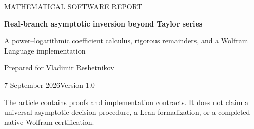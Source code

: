 \documentclass[11pt,a4paper]{article}
\numberwithin{equation}{section}
\theoremstyle{definition}\newtheorem{definition}[theorem]{Definition}
\theoremstyle{remark}\newtheorem{remark}[theorem]{Remark}
\begin{document}
\begin{titlepage}
\vspace*{14mm}
{\large MATHEMATICAL SOFTWARE REPORT\par}
\vspace{10mm}
{\Huge\bfseries Real-branch asymptotic inversion beyond Taylor series\par}
\vspace{8mm}
{\Large A power--logarithmic coefficient calculus, rigorous remainders, and a Wolfram Language implementation\par}
\vspace{13mm}
{\large Prepared for Vladimir Reshetnikov\par}
{\large 7 September 2026\quad\textbullet\quad Version 1.0\par}
\vspace{13mm}
\begin{abstract}
An inverse at a singular endpoint must be selected by a real asymptotic condition, not by the unspecified branch of a symbolic inverse. We construct the branch $g(y)>0$ with $g(y)\sim y$ for the two motivating functions $x+x^2(1+\log x)$ and $x+x^{\sqrt2}$. More generally, we give an explicit differential-operator formula for the inverse of
\[
cx^\alpha\!\left(1+\sum_{j=1}^m x^{\delta_j}P_j(\log x)\right),
\qquad c,\alpha,\delta_j>0.
\]
The formula is valid without analyticity at the endpoint. We prove existence and uniqueness of the selected branch, absolute convergence for sufficiently small positive arguments in this finite-model class, locally finite irrational-power support, and a logarithm-sensitive remainder theorem for arbitrary power cutoffs. A separate finite-smoothness theorem justifies Lagrange derivative blocks for a larger class of real functions. Source-jet transport and residual-to-error estimates connect formal computation to actual inverses. The accompanying Wolfram Language package implements exact weighted enumeration, resonant coefficient aggregation, conditional general derivative blocks, and guarded input-jet inversion. Independent mathematical and structural checks passed; native Wolfram regression tests are supplied but were not executed in this environment.
\end{abstract}
\vfill
{\small The article contains proofs and implementation contracts. It does not claim a universal asymptotic decision procedure, a Lean formalization, or a completed native Wolfram certification.}
\end{titlepage}
\tableofcontents
\newpage
\end{document}
